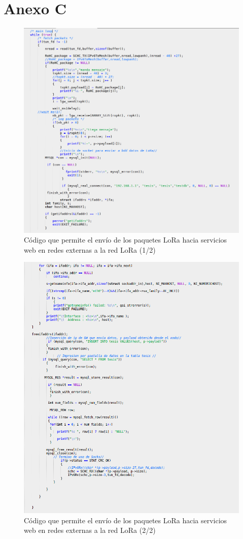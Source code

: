 \chapter{Anexo C}


\begin{figure}[!ht]
\centering
\includegraphics[angle=0,scale=0.4]{images/modulocode1}
\caption{Código que permite el envío de los paquetes LoRa hacia servicios web en redes externas a la red LoRa (1/2)}
\label{anexc:1}
\end{figure}

\begin{figure}[!ht]
\centering
\includegraphics[angle=0,scale=0.4]{images/modulocode2}
\caption{Código que permite el envío de los paquetes LoRa hacia servicios web en redes externas a la red LoRa (2/2)}
\label{anexc:2}
\end{figure}